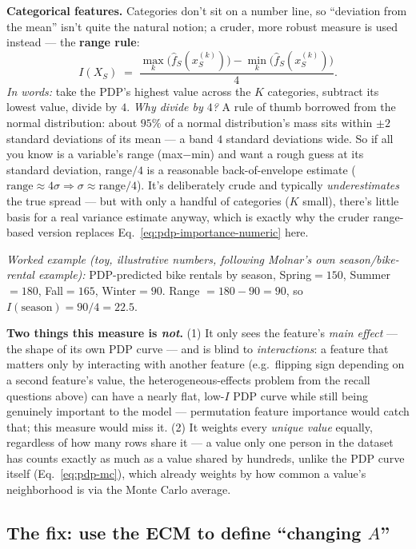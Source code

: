 \textbf{Categorical features.} Categories don't sit on a number line, so
``deviation from the mean'' isn't quite the natural notion; a cruder,
more robust measure is used instead --- the \textbf{range rule}:
\begin{equation}
I(X_S) \;=\; \frac{\max_k\big(\hat f_S(x_S^{(k)})\big)
- \min_k\big(\hat f_S(x_S^{(k)})\big)}{4}.
\label{eq:pdp-importance-categorical}
\end{equation}
\noindent\textit{In words:} take the PDP's highest value across the $K$
categories, subtract its lowest value, divide by $4$. \emph{Why divide by
$4$?} A rule of thumb borrowed from the normal distribution: about $95\%$
of a normal distribution's mass sits within $\pm 2$ standard deviations of
its mean --- a band $4$ standard deviations wide. So if all you know is a
variable's range (max$-$min) and want a rough guess at its standard
deviation, range$/4$ is a reasonable back-of-envelope estimate
($\text{range}\approx 4\sigma \Rightarrow \sigma\approx
\text{range}/4$). It's deliberately crude and typically
\emph{underestimates} the true spread --- but with only a handful of
categories ($K$ small), there's little basis for a real variance estimate
anyway, which is exactly why the cruder range-based version replaces
Eq.~\eqref{eq:pdp-importance-numeric} here.

\emph{Worked example (toy, illustrative numbers, following Molnar's own
season/bike-rental example):} PDP-predicted bike rentals by season,
Spring$=150$, Summer$=180$, Fall$=165$, Winter$=90$. Range
$=180-90=90$, so $I(\text{season}) = 90/4 = 22.5$.

\textbf{Two things this measure is \emph{not}.} (1) It only sees the
feature's \emph{main effect} --- the shape of its own PDP curve --- and
is blind to \emph{interactions}: a feature that matters only by
interacting with another feature (e.g.\ flipping sign depending on a
second feature's value, the heterogeneous-effects problem from the
recall questions above) can have a nearly flat, low-$I$ PDP curve while
still being genuinely important to the model --- permutation feature
importance would catch that; this measure would miss it. (2) It weights
every \emph{unique value} equally, regardless of how many rows share it
--- a value only one person in the dataset has counts exactly as much as
a value shared by hundreds, unlike the PDP curve itself
(Eq.~\eqref{eq:pdp-mc}), which already weights by how common a value's
neighborhood is via the Monte Carlo average.

\subsection{The fix: use the ECM to define ``changing \texorpdfstring{$A$}{A}''}

